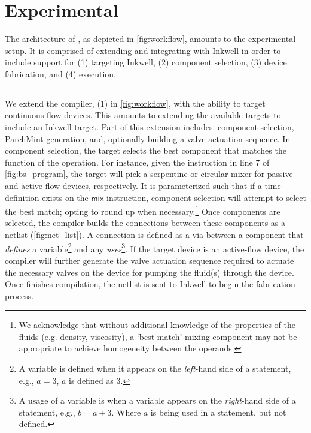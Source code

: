 \section{Experimental}
\label{sec:experimental}
The architecture of \tool{}, as depicted in \cref{fig:workflow}, amounts to the experimental setup.
It is comprised of extending and integrating \bs{} with Inkwell in order to include support for (1) targeting Inkwell, (2) component selection, (3) device fabrication, and (4) execution.

\subsection{\bs{}}
\label{sec:bioscript}

We extend the \bs{} compiler, (1) in \cref{fig:workflow}, with the ability to target continuous flow devices.
This amounts to extending the available targets to include an Inkwell\cite{mcdaniel2018design} target.
Part of this extension includes: component selection, ParchMint generation, and, optionally building a valve actuation sequence.
In component selection, the target selects the best component that matches the function of the operation.
For instance, given the instruction in line 7 of \cref{fig:bs_program}, the target will pick a serpentine or circular mixer for passive and active flow devices, respectively.
It is parameterized such that if a time definition exists on the $\textsf{mix}$ instruction, component selection will attempt to select the best match; opting to round up when necessary.\footnote{We acknowledge that without additional knowledge of the properties of the fluids (e.g. density, viscosity), a `best match' mixing component may not be appropriate to achieve homogeneity between the operands.}
Once components are selected, the compiler builds the connections between these components as a netlist (\cref{fig:net_list}).
A connection is defined as a via between a component that \textit{defines} a variable\footnote{A variable is defined when it appears on the \textit{left}-hand side of a statement, e.g., $a = 3$, $a$ is defined as $3$.} and any \textit{uses}\footnote{A usage of a variable is when a variable appears on the \textit{right}-hand side of a statement, e.g., $b = a + 3$. Where $a$ is being used in a statement, but not defined.}.
If the target device is an active-flow device, the compiler will further generate the valve actuation sequence required to actuate the necessary valves on the device for pumping the fluid(s) through the device.
Once \bs{} finishes compilation, the netlist is sent to Inkwell to begin the fabrication process.


